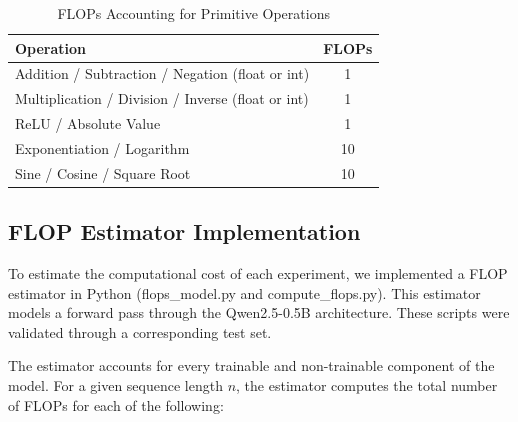 \documentclass[a4paper,12pt]{article}
\begin{document}
\begin{table}[h]
  \centering

  \begin{tabular}{lc}
    \hline
    Operation & FLOPs \\
    \hline
    Addition / Subtraction / Negation (float or int) & 1 \\
    Multiplication / Division / Inverse (float or int) & 1 \\
    ReLU / Absolute Value & 1 \\
    Exponentiation / Logarithm & 10 \\
    Sine / Cosine / Square Root & 10 \\
    \hline
  \end{tabular}
  \vspace{0.2cm}
  \caption{FLOPs Accounting for Primitive Operations}
  \label{tab:flops_primitives}
\end{table}

\subsection*{FLOP Estimator Implementation}

To estimate the computational cost of each experiment, we implemented a FLOP estimator in Python (flops\_model.py and compute\_flops.py). This estimator models a forward pass through the Qwen2.5-0.5B architecture. These scripts were validated through a corresponding test set.

The estimator accounts for every trainable and non-trainable component of the model. For a given sequence length $n$, the estimator computes the total number of FLOPs for each of the following:
\end{document}
